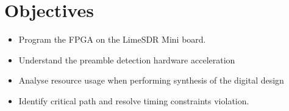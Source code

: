 \section*{Objectives}

\begin{itemize}
    \item Program the FPGA on the LimeSDR Mini board.
    \item Understand the preamble detection hardware acceleration
     \item Analyse resource usage when performing synthesis of the digital design
     \item Identify critical path and resolve timing constraints violation.
\end{itemize}
